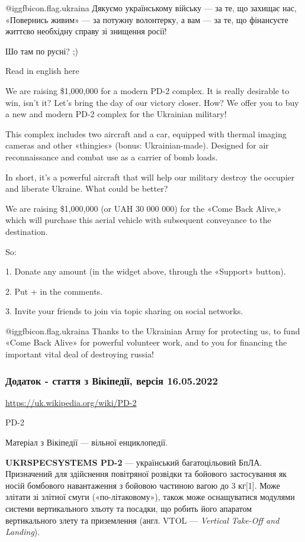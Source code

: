 @igg{fbicon.flag.ukraina} Дякуємо українському війську — за те, що захищає нас,
«Повернись живим» — за потужну волонтерку, а вам — за те, що фінансуєте життєво
необхідну справу зі знищення росії!


Шо там по русні? ;)

Read in english here

We are raising \$1,000,000 for a modern PD-2 complex. It is really desirable to
win, isn't it? Let's bring the day of our victory closer. How? We offer you to
buy a new and modern PD-2 complex for the Ukrainian military!

This complex includes two aircraft and a car, equipped with thermal imaging
cameras and other «thingies» (bonus: Ukrainian-made). Designed for air
reconnaissance and combat use as a carrier of bomb loads.

In short, it's a powerful aircraft that will help our military destroy the
occupier and liberate Ukraine. What could be better?

We are raising \$1,000,000 (or UAH 30 000 000) for the «Come Back Alive,» which
will purchase this aerial vehicle with subsequent conveyance to the
destination.

So:

1. Donate any amount (in the widget above, through the «Support» button).

2. Put + in the comments.

3. Invite your friends to join via topic sharing on social networks.

@igg{fbicon.flag.ukraina} Thanks to the Ukrainian Army for protecting us, to
fund «Come Back Alive» for powerful volunteer work, and to you for financing
the important vital deal of destroying russia!

\subsubsection{Додаток - стаття з Вікіпедії, версія 16.05.2022}

\url{https://uk.wikipedia.org/wiki/PD-2}


PD-2

Матеріал з Вікіпедії — вільної енциклопедії.

\textbf{UKRSPECSYSTEMS PD-2} — український багатоцільовий БпЛА. Призначений для
здійснення повітряної розвідки та бойового застосування як носій бомбового
навантаження з бойовою частиною вагою до 3 кг[1]. Може злітати зі злітної смуги
(«по-літаковому»), також може оснащуватися модулями системи вертикального
зльоту та посадки, що робить його апаратом вертикального злету та приземлення
(англ. VTOL — \emph{Vertical Take-Off and Landing}).


